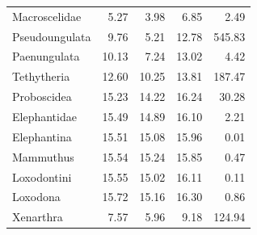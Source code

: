 \documentclass[]{elsarticle} %
\begin{document}
\begin{longtable}[t]{lrrrr}
Macroscelidae & 5.27 & 3.98 & 6.85 & 2.49\\
Pseudoungulata & 9.76 & 5.21 & 12.78 & 545.83\\
Paenungulata & 10.13 & 7.24 & 13.02 & 4.42\\
\addlinespace
Tethytheria & 12.60 & 10.25 & 13.81 & 187.47\\
Proboscidea & 15.23 & 14.22 & 16.24 & 30.28\\
Elephantidae & 15.49 & 14.89 & 16.10 & 2.21\\
Elephantina & 15.51 & 15.08 & 15.96 & 0.01\\
Mammuthus & 15.54 & 15.24 & 15.85 & 0.47\\
\addlinespace
Loxodontini & 15.55 & 15.02 & 16.11 & 0.11\\
Loxodona & 15.72 & 15.16 & 16.30 & 0.86\\
Xenarthra & 7.57 & 5.96 & 9.18 & 124.94\\*
\end{longtable}
\end{document}
